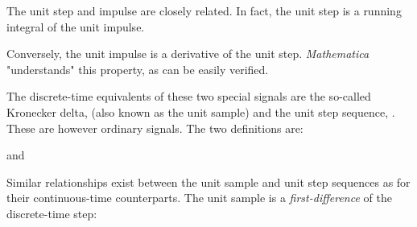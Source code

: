 \documentclass{article}
\begin{document}
\begin{CellGroup}
\begin{CellGroup}
\begin{CellGroup}

\end{CellGroup}
The unit step and impulse are closely related. In fact, the unit step is a running integral of the unit impulse. 


Conversely, the unit  impulse is a derivative of the unit step. {\itshape Mathematica} "understands" this property, as can be easily verified.



\begin{CellGroup}

\end{CellGroup}
The discrete-time equivalents of these two special signals are the so-called  Kronecker delta, \inlineTFinmath{\delta [n]} (also known as the unit
sample) and the unit step sequence, . These are however ordinary signals. The two definitions are:




and


Similar relationships exist between the unit sample and unit step sequences as for their continuous-time counterparts. The unit sample is a {\itshape
first-difference} of the discrete-time step:




\end{CellGroup}
\end{CellGroup}
\end{document}
